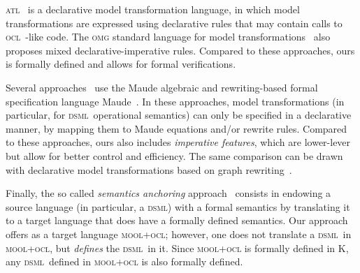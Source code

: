 \documentclass[a4paper,11pt,twoside]{article}
\newcommand{\dsml}{\textsc{dsml}}
\newcommand{\ocl}{\textsc{ocl}}
\begin{document}
\textsc{atl}~\cite{DBLP:journals/scp/JouaultABK08} is a declarative model transformation language, in which model transformations are expressed using declarative rules that may contain calls to \ocl\ -like code. The \textsc{omg} standard language for model transformations~\cite{qvt} also proposes mixed declarative-imperative rules. Compared to these approaches, ours is formally defined and allows for formal verifications.

Several approaches~\cite{bhm08,rdv09,r10b} use the Maude algebraic and rewriting-based formal specification language Maude~\cite{allAboutMaude}.  In these approaches, model transformations (in particular, 
for \dsml\ operational semantics) can only be specified in a declarative manner, by mapping them to Maude equations and/or rewrite rules.
 Compared to these approaches, ours also includes \emph{imperative features}, which are lower-lever but allow for better
control and efficiency.
The same comparison can be drawn with declarative model transformations based on graph rewriting~\cite{DBLP:conf/agtive/Taentzer03,DBLP:conf/kbse/CsertanHMPPV02}.

Finally, the so called \emph{semantics anchoring} approach~\cite{DBLP:conf/ecmdafa/0003SAJ05} consists in endowing a source language (in particular, a \dsml) with a formal semantics by translating it
 to a target language that does have a formally defined  semantics. Our approach offers as a target language
\textsc{mool+ocl}; however, one does not translate a \dsml\ in \textsc{mool+ocl}, but \emph{defines} the \dsml\ in it.
Since  \textsc{mool+ocl}
is formally defined in K, any \dsml\ defined in  \textsc{mool+ocl} is also formally defined.


\end{document}
